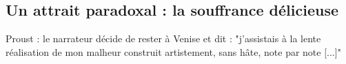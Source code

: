 \documentclass[a4paper,10pt]{article}
\begin{document}
		
	\subsection{Un attrait paradoxal : la souffrance délicieuse}
		Proust \cite{Proust1927} : le narrateur décide de rester à Venise et dit : "j'assistais à la lente réalisation de mon malheur construit artistement, sans hâte, note par note [...]"
\medskip


\end{document}
